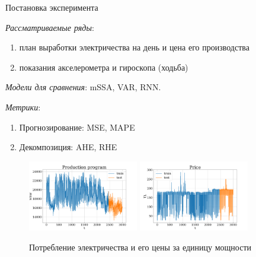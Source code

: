 \documentclass[10pt]{beamer}
\theoremstyle{definition}
\begin{document}
	\begin{frame}{Постановка эксперимента}
		
		\textit{Рассматриваемые ряды}:
		
		 \begin{enumerate}
		 	\item план выработки электричества на день и цена его производства
		 	\item показания акселерометра и гироскопа (ходьба)
		 \end{enumerate}
		 
		 \textit{Модели для сравнения}: mSSA, VAR, RNN.
		 
		 \textit{Метрики}: 
		 
		 \begin{enumerate}
		 	\item Прогнозирование: MSE, MAPE
		 	\item Декомпозиция: AHE, RHE
		 \end{enumerate}
		 
		 \begin{figure}[h]
		 	\centering
		 	\includegraphics[width=0.43\textwidth, keepaspectratio]{../../figs/Electricity_Production}
		 	\includegraphics[width=0.43\textwidth, keepaspectratio]{../../figs/Electricity_Price}
		 	\caption{Потребление электричества и его цены за единицу мощности}\label{fig:electr_data}
		 \end{figure}
		
	\end{frame}
	
\end{document}
